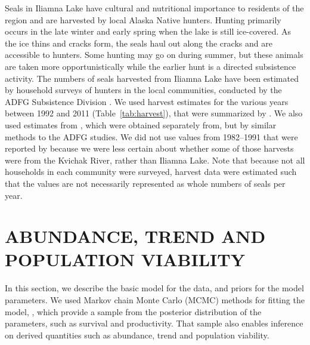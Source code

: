 \documentclass[]{risa}\usepackage[]{graphicx}\usepackage[]{color}
\begin{document}
Seals in Iliamna Lake have cultural and nutritional importance to residents of the region \citep{Burn:Van:With:Hole:Asko:inte:2016} and are harvested by local Alaska Native hunters. Hunting primarily occurs in the late winter and early spring when the lake is still ice-covered. As the ice thins and cracks form, the seals haul out along the cracks and are accessible to hunters. Some hunting may go on during summer, but these animals are taken more opportunistically while the earlier hunt is a directed subsistence activity. The numbers of seals harvested from Iliamna Lake have been estimated by household surveys of hunters in the local communities, conducted by the ADFG Subsistence Division \citep{Fall:Hole:Davi:Krie:Kost:subs:2006,Krie:Hole:Kost:subs:2009,Burn:Van:With:Hole:Asko:inte:2016}. We used harvest estimates for the various years between 1992 and 2011 (Table~\ref{tab:harvest}), that were summarized by \citet{Burn:Van:With:Hole:Asko:inte:2016}. We also used estimates from \citet{Burn:Chyt:Gome:Asko:inte:2011}, which were obtained separately from, but by similar methods to the ADFG studies. We did not use values from 1982--1991 that were reported by \citet{Burn:Van:With:Hole:Asko:inte:2016} because we were less certain about whether some of those harvests were from the Kvichak River, rather than Iliamna Lake. Note that because not all households in each community were surveyed, harvest data were estimated such that the values are not necessarily represented as whole numbers of seals per year. 



\section{ABUNDANCE, TREND AND POPULATION VIABILITY}
In this section, we describe the basic model for the data, and priors for the model parameters.  We used Markov chain Monte Carlo (MCMC) methods for fitting the model, \citet[e.g.][]{Gilk:Rich:Spie:intr:1996}, which provide a sample from the posterior distribution of the parameters, such as survival and productivity.  That sample also enables inference on derived quantities such as abundance, trend and population viability.
\end{document}
